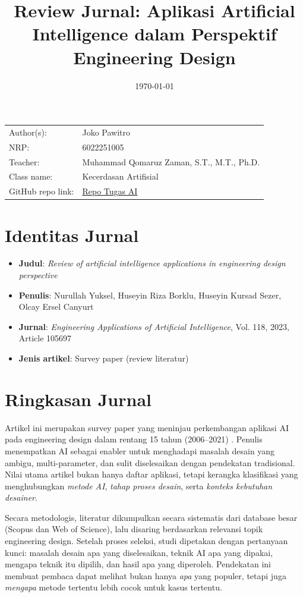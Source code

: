 \documentclass{article}
\title{Review Jurnal: Aplikasi Artificial Intelligence dalam Perspektif Engineering Design}
\date{\today}
\begin{document}
\maketitle

\noindent\begin{tabular}{@{}ll}
    Author(s): & Joko Pawitro\\
    NRP: & 6022251005\\
    Teacher: & Muhammad Qomaruz Zaman, S.T., M.T., Ph.D.\\
    Class name: & Kecerdasan Artifisial\\
    GitHub repo link: & \href{https://github.com/jpawitro/reb_2025_2026_genap_EE255271_kecerdasan_buatan_tugas_01}{Repo Tugas AI}
\end{tabular}
\vspace{0.8cm}

\section*{Identitas Jurnal}
\begin{itemize}
    \item \textbf{Judul}: \textit{Review of artificial intelligence applications in engineering design perspective}
    \item \textbf{Penulis}: Nurullah Yuksel, Huseyin Riza Borklu, Huseyin Kursad Sezer, Olcay Ersel Canyurt
    \item \textbf{Jurnal}: \textit{Engineering Applications of Artificial Intelligence}, Vol. 118, 2023, Article 105697
    \item \textbf{Jenis artikel}: Survey paper (review literatur)
\end{itemize}

\section*{Ringkasan Jurnal}
Artikel ini merupakan survey paper yang meninjau perkembangan aplikasi AI pada engineering design dalam rentang 15 tahun (2006--2021) \cite{yuksel2023review}. Penulis menempatkan AI sebagai enabler untuk menghadapi masalah desain yang ambigu, multi-parameter, dan sulit diselesaikan dengan pendekatan tradisional. Nilai utama artikel bukan hanya daftar aplikasi, tetapi kerangka klasifikasi yang menghubungkan \textit{metode AI}, \textit{tahap proses desain}, serta \textit{konteks kebutuhan desainer}.

Secara metodologis, literatur dikumpulkan secara sistematis dari database besar (Scopus dan Web of Science), lalu disaring berdasarkan relevansi topik engineering design. Setelah proses seleksi, studi dipetakan dengan pertanyaan kunci: masalah desain apa yang diselesaikan, teknik AI apa yang dipakai, mengapa teknik itu dipilih, dan hasil apa yang diperoleh. Pendekatan ini membuat pembaca dapat melihat bukan hanya \textit{apa} yang populer, tetapi juga \textit{mengapa} metode tertentu lebih cocok untuk kasus tertentu.
\end{document}
